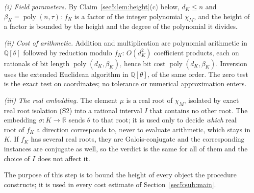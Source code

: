 \documentclass[journal]{IEEEtran}
\theoremstyle{plainn}
\theoremstyle{remark}
\newcommand{\poly}{\operatorname{poly}}
\begin{document}
\emph{(i) Field parameters.} By Claim~\ref{sec5:lem:height}(c) below, $d_K\le n$ and
$\beta_K=\poly(n,\tau)$: $f_K$ is a factor of the integer polynomial $\chi_M$, and the height of a
factor is bounded by the height and the degree of the polynomial it divides.

\emph{(ii) Cost of arithmetic.} Addition and multiplication are polynomial arithmetic in
$\mathbb{Q}[\theta]$ followed by reduction modulo $f_K$: $O(d_K^{2})$ coefficient products, each on
rationals of bit length $\poly(d_K,\beta_K)$, hence bit cost $\poly(d_K,\beta_K)$. Inversion uses the
extended Euclidean algorithm in $\mathbb{Q}[\theta]$, of the same order. The zero test is the exact
test on coordinates; no tolerance or numerical approximation enters.

\emph{(iii) The real embedding.} The element $\mu$ is a real root of $\chi_M$, isolated by exact real
root isolation (S2) into a rational interval $I$ that contains no other root. The embedding
$\sigma\colon K\to\mathbb{R}$ sends $\theta$ to that root; it is used only to decide \emph{which} real
root of $f_K$ a direction corresponds to, never to evaluate arithmetic, which stays in $K$. If $f_K$
has several real roots, they are Galois-conjugate and the corresponding instances are conjugate as well,
so the verdict is the same for all of them and the choice of $I$ does not affect it.


The purpose of this step is to bound the height of every object the procedure constructs; it is used
in every cost estimate of Section~\ref{sec5:sub:main}.
\end{document}
